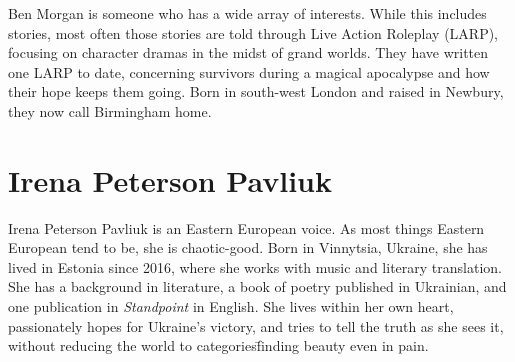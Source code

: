 Ben Morgan is someone who has a wide array of interests. While this
includes stories, most often those stories are told through Live
Action Roleplay (LARP), focusing on character dramas in the midst of
grand worlds. They have written one LARP to date, concerning survivors
during a magical apocalypse and how their hope keeps them going. Born
in south-west London and raised in Newbury, they now call Birmingham
home.

% 
% 
% 
% 
% 
%
% 
% 

\section*{Irena Peterson Pavliuk}%

Irena Peterson Pavliuk %
%
% 
% 
is an Eastern European voice. As most things Eastern European tend to be,
she is chaotic-good. Born in Vinnytsia, Ukraine, she has lived in Estonia
since 2016, where she works with music and literary translation. She has
a background in literature, a book of poetry published in Ukrainian, and
one publication in \textit{Standpoint} in English. She lives within her own heart,
passionately hopes for Ukraine’s victory, and tries to tell the truth as
she sees it, without reducing the world to categories\=finding beauty even in pain.

% 
%


% 
% 
% 
% 



